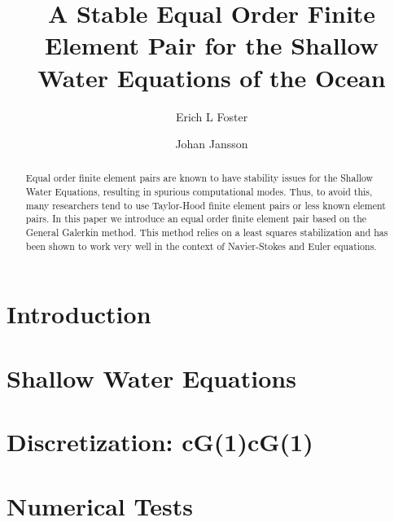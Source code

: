\documentclass{elsarticle}
\begin{document}
  \begin{frontmatter}
    \author[1]{Erich L Foster}

    \author[1]{Johan Jansson}

    \address[1]{Basque Center for Applied Mathematics, Alameda Mazarredo, 14,
      48009 Bilbao, Basque Country -- Spain}

    \title{A Stable Equal Order Finite Element Pair for the Shallow Water
    Equations of the Ocean}

    \begin{abstract}
      Equal order finite element pairs are known to have stability issues for
      the Shallow Water Equations, resulting in spurious computational modes.
      Thus, to avoid this, many researchers tend to use Taylor-Hood finite
      element pairs or less known element pairs. In this paper we introduce an
      equal order finite element pair based on the General Galerkin method. This
      method relies on a least squares stabilization and has been shown to work
      very well in the context of Navier-Stokes and Euler equations.
    \end{abstract}
  \end{frontmatter}

  \section{Introduction} \label{sec:Intro}
  

  \section{Shallow Water Equations} \label{sec:SWE}
  

  \section{Discretization: cG(1)cG(1)} \label{sec:Discrete}
  

  \section{Numerical Tests} \label{sec:Tests}
  

  
  
\end{document}
